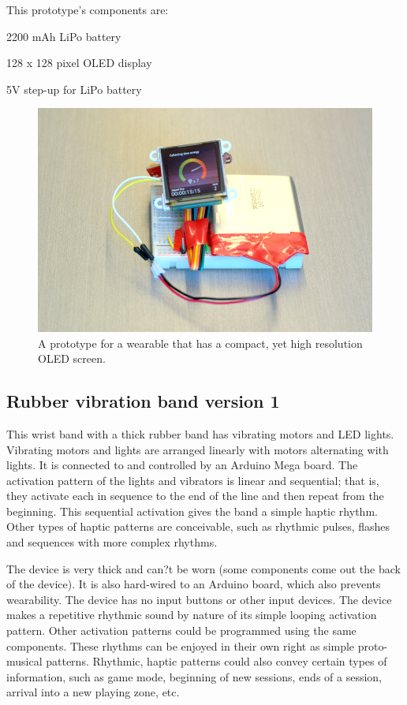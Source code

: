 \documentclass{chi-ext}
\begin{document}
This prototype's components are:
\begin{inparaenum}
\item 2200 mAh LiPo battery
\item 128 x 128 pixel OLED display
\item 5V step-up for LiPo battery
\end{inparaenum}

\begin{figure}
  \begin{center}
  \includegraphics[width=\columnwidth]{images/P1130382.jpg}
  \caption{A prototype for a wearable that has a compact, yet high resolution OLED screen.}
  \label{fig:marginparsample}
  \end{center}  
\end{figure}


\subsection{Rubber vibration band version 1}
This wrist band with a thick rubber band has vibrating motors and LED lights. Vibrating motors and lights are arranged linearly with motors alternating with lights. It is connected to and controlled by an Arduino Mega board. The activation pattern of the lights and vibrators is linear and sequential; that is, they activate each in sequence to the end of the line and then repeat from the beginning. This sequential activation gives the band a simple haptic rhythm. Other types of haptic patterns are conceivable, such as rhythmic pulses, flashes and sequences with more complex rhythms. 

The device is very thick and can?t be worn (some components come out the back of the device). It is also hard-wired to an Arduino board, which also prevents wearability. The device has no input buttons or other input devices. The device makes a repetitive rhythmic sound by nature of its simple looping activation pattern. Other activation patterns could be programmed using the same components. These rhythms can be enjoyed in their own right as simple proto-musical patterns. Rhythmic, haptic patterns could also convey certain types of information, such as game mode, beginning of new sessions, ends of a session, arrival into a new playing zone, etc. 
\end{document}
